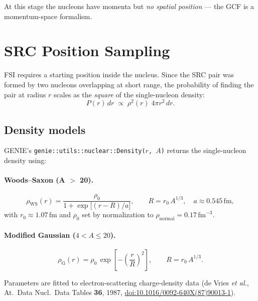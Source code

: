 \documentclass[11pt,a4paper]{article}
\newcommand{\unit}[1]{\,\mathrm{#1}}
\newcommand{\fm}{\unit{fm}}
\begin{document}
At this stage the nucleons have momenta but \emph{no spatial position} ---
the GCF is a momentum-space formalism.

\section{SRC Position Sampling}
\label{sec:position}

FSI requires a starting position inside the nucleus.  Since the SRC pair
was formed by two nucleons overlapping at short range, the probability of
finding the pair at radius $r$ scales as the \emph{square} of the
single-nucleon density:
\begin{equation}\label{eq:pos}
  P(r)\,dr \;\propto\; \rho^{2}(r)\;4\pi r^{2}\,dr.
\end{equation}

\subsection{Density models}

GENIE's \texttt{genie::utils::nuclear::Density($r$,\,$A$)} returns the
single-nucleon density using:

\paragraph{Woods--Saxon (A $>$ 20).}
\begin{equation}
  \rho_{\text{WS}}(r) = \frac{\rho_{0}}{1 + \exp\!\bigl[(r - R)/a\bigr]},
  \qquad
  R = r_{0}\,A^{1/3},\quad a \approx 0.545\fm,
\end{equation}
with $r_{0} \approx 1.07\fm$ and $\rho_{0}$ set by normalization to
$\rho_{\text{normal}} = 0.17\fm^{-3}$.

\paragraph{Modified Gaussian ($4 < A \le 20$).}
\begin{equation}
  \rho_{\text{G}}(r) = \rho_{0}\,
    \exp\!\left[-\left(\frac{r}{R}\right)^{2}\right],
  \qquad R = r_{0}\,A^{1/3}.
\end{equation}

Parameters are fitted to electron-scattering charge-density data
(de Vries \textit{et al.}, At.\ Data Nucl.\ Data Tables \textbf{36}, 1987,
\href{https://doi.org/10.1016/0092-640X(87)90013-1}{doi:10.1016/0092-640X(87)90013-1}).
\end{document}
